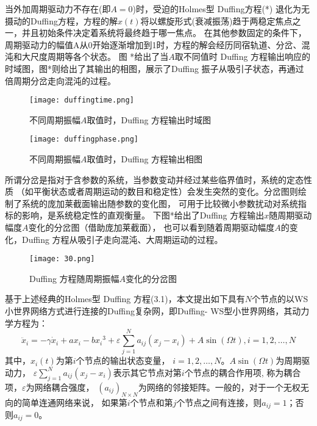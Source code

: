 当外加周期驱动力不存在(即$A=0$)时，受迫的Holmes型 Duffing方程(*)
退化为无摄动的Duffing方程，方程的解$x\left(t\right)$将以螺旋形式(衰减振荡)趋于两稳定焦点之一，并且初始条件决定着系统将最终趋于哪一焦点。
在其他参数固定的条件下，周期驱动力的幅值A从0开始逐渐增加到1时，方程的解会经历同宿轨道、分岔、混沌和大尺度周期等各个状态。
图 *给出了当$A$取不同值时 Duffing 方程输出响应的时域图，图*则给出了其输出的相图，展示了Duffing 振子从吸引子状态，再通过倍周期分岔走向混沌的过程。
 \begin{figure}[!htbp]
    \centering
    \texttt{[image: duffingtime.png]}
    \caption{不同周期振幅$A$取值时，Duffing 方程输出时域图}
 \end{figure}

 \begin{figure}[!htbp]
    \centering
    \texttt{[image: duffingphase.png]}
    \caption{不同周期振幅$A$取值时，Duffing 方程输出相图}
 \end{figure}

所谓分岔是指对于含参数的系统，当参数变动并经过某些临界值时，系统的定态性质
（如平衡状态或者周期运动的数目和稳定性）会发生突然的变化。分岔图则绘制了系统的庞加莱截面输出随参数的变化图，
可用于比较微小参数扰动对系统指标的影响，是系统稳定性的直观衡量。 下图*给出了Duffing 方程输出$x$随周期驱动幅度$A$变化的分岔图（借助庞加莱截面），
也可以看到随着周期驱动幅度$A$的变化，Duffing 方程从吸引子走向混沌、大周期运动的过程。
 \begin{figure}[!htbp]
    \centering
    \texttt{[image: 30.png]}\caption{Duffing 方程随周期振幅$A$变化的分岔图}
 \end{figure}


基于上述经典的Holmes型 Duffing 方程(3.1)，本文提出如下具有$N$个节点的以WS小世界网络方式进行连接的Duffing复杂网，即Duffing- WS型小世界网络，其动力学方程为：
\begin{equation}
    \ddot{x}_{i}=-\gamma \dot{x}_{i}+a x_{i}-b x_{i}{ }^{3}+\varepsilon \sum_{j=1}^{N} a_{i j}\left(x_{j}-x_{i}\right)+A \sin (\Omega t), i=1,2, \ldots, N
\end{equation}
其中，$x_i(t)$为第$i$个节点的输出状态变量， $i=1,2,\ldots,N$。$A\sin(\Omega t)$为周期驱动力， 
$\varepsilon \sum_{j=1}^{N} a_{i j}\left(x_{j}-x_{i}\right)$表示其它节点对第$i$个节点的耦合作用项, 称为耦合项，$\varepsilon$为网络耦合强度，
$\left(a_{ij}\right)_{N\times N}$为网络的邻接矩阵。一般的，对于一个无权无向的简单连通网络来说，
如果第$i$个节点和第$j$个节点之间有连接，则$a_{ij} = 1$；否则$a_{ij} = 0$。

